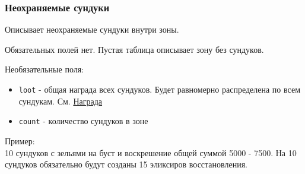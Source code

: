 \subsubsection{Неохраняемые сундуки}
\label{bags}
Описывает неохраняемые сундуки внутри зоны.

Обязательных полей нет. Пустая таблица описывает зону без сундуков.

Необязательные поля:
\begin{itemize}
\item \texttt{loot} - общая награда всех сундуков. Будет равномерно распределена по всем сундукам. См. \hyperref[loot]{Награда}
\item \texttt{count} - количество сундуков в зоне
\end{itemize}

Пример:\\
10 сундуков с зельями на буст и воскрешение общей суммой 5000 - 7500.
На 10 сундуков обязательно будут созданы 15 эликсиров восстановления.

\begin{figure}[H]

\end{figure}